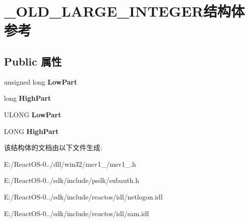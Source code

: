 \hypertarget{struct___o_l_d___l_a_r_g_e___i_n_t_e_g_e_r}{}\section{\+\_\+\+O\+L\+D\+\_\+\+L\+A\+R\+G\+E\+\_\+\+I\+N\+T\+E\+G\+E\+R结构体 参考}
\label{struct___o_l_d___l_a_r_g_e___i_n_t_e_g_e_r}
\subsection*{Public 属性}
\begin{DoxyCompactItemize}
\item 
\mbox{\label{struct___o_l_d___l_a_r_g_e___i_n_t_e_g_e_r_ada9f058d7460fb8fb767c9507206da98}} 
unsigned long {\bfseries Low\+Part}
\item 
\mbox{\label{struct___o_l_d___l_a_r_g_e___i_n_t_e_g_e_r_afa44869754837f6cfbe352ac85e3ee67}} 
long {\bfseries High\+Part}
\item 
\mbox{\label{struct___o_l_d___l_a_r_g_e___i_n_t_e_g_e_r_aa9c6ad3405074505080cc0a58ea63131}} 
U\+L\+O\+NG {\bfseries Low\+Part}
\item 
\mbox{\label{struct___o_l_d___l_a_r_g_e___i_n_t_e_g_e_r_a84a0a8cc9046533e8e2111f24adc3dd4}} 
L\+O\+NG {\bfseries High\+Part}
\end{DoxyCompactItemize}


该结构体的文档由以下文件生成\+:\begin{DoxyCompactItemize}
\item 
E\+:/\+React\+O\+S-\/0../dll/win32/msv1\+\_/msv1\+\_.\+h\item 
E\+:/\+React\+O\+S-\/0../sdk/include/psdk/subauth.\+h\item 
E\+:/\+React\+O\+S-\/0../sdk/include/reactos/idl/netlogon.\+idl\item 
E\+:/\+React\+O\+S-\/0../sdk/include/reactos/idl/sam.\+idl\end{DoxyCompactItemize}
